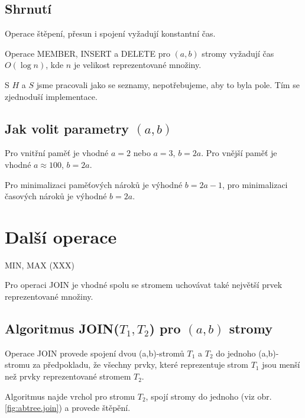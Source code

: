 \subsection{Shrnutí}

Operace štěpení, přesun i spojení vyžadují konstantní čas. 
\begin{theorem}
Operace MEMBER, INSERT a DELETE pro $(a,b)$ stromy vyžadují čas
$O(\log n)$, kde $n$ je velikost reprezentované množiny.
\end{theorem}

S $H$ a $S$ jsme pracovali jako se seznamy, nepotřebujeme, aby to byla
pole. Tím se zjednoduší implementace. 

\subsection{Jak volit parametry $(a,b)$}

Pro vnitřní paměť je vhodné $a = 2$ nebo $a=3$, $b = 2a$.
Pro vnější paměť je vhodné $a \approx 100$, $b = 2a$.

Pro minimalizaci paměťových nároků je výhodné $b = 2a-1$,
pro minimalizaci časových nároků je výhodné $b = 2a$.

\section{Další operace}

MIN, MAX (XXX)

Pro operaci JOIN je vhodné spolu se stromem uchovávat také 
největší prvek reprezentované množiny.

\subsection{Algoritmus JOIN($T_1, T_2$) pro $(a,b)$ stromy}

Operace JOIN provede spojení dvou (a,b)-stromů $T_1$ a $T_2$ 
do jednoho (a,b)-stromu za předpokladu, že všechny prvky, které 
reprezentuje strom $T_1$ jsou menší než prvky reprezentované stromem
$T_2$.

Algoritmus najde vrchol pro stromu $T_2$, spojí stromy do jednoho (viz
obr. \ref{fig:abtree.join}) a provede štěpění.

